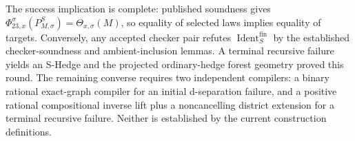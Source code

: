 The success implication is complete: published soundness gives \(\Phi_{23,x}^{\sigma}(P_{M,\sigma}^S)=\Theta_{x,\sigma}(M)\), so equality of selected laws implies equality of targets. Conversely, any accepted checker pair refutes \(\operatorname{Ident}^{\mathrm{fin}}_S\) by the established checker-soundness and ambient-inclusion lemmas. A terminal recursive failure yields an S-Hedge and the projected ordinary-hedge forest geometry proved this round. The remaining converse requires two independent compilers: a binary rational exact-graph compiler for an initial d-separation failure, and a positive rational compositional inverse lift plus a noncancelling district extension for a terminal recursive failure. Neither is established by the current construction definitions.